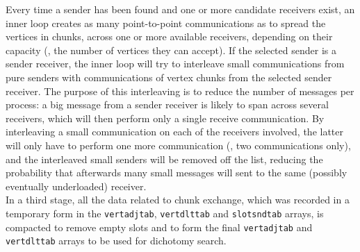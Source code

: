 Every time a sender has been found and one or more candidate receivers
exist, an inner loop creates as many point-to-point communications as
to spread the vertices in chunks, across one or more available
receivers, depending on their capacity (\ie, the number of vertices
they can accept). If the selected sender is a sender receiver, the
inner loop will try to interleave small communications from pure
senders with communications of vertex chunks from the selected
sender receiver. The purpose of this interleaving is to reduce the
number of messages per process: a big message from a sender receiver
is likely to span across several receivers, which will then perform
only a single receive communication. By interleaving a small
communication on each of the receivers involved, the latter will only
have to perform one more communication (\ie, two communications only),
and the interleaved small senders will be removed off the list,
reducing the probability that afterwards many small messages will sent
to the same (possibly eventually underloaded) receiver.
\\

In a third stage, all the data related to chunk exchange, which was
recorded in a temporary form in the \texttt{vertadjtab},
\texttt{vertdlttab} and \texttt{slotsndtab} arrays, is compacted to
remove empty slots and to form the final \texttt{vertadjtab} and
\texttt{vertdlttab} arrays to be used for dichotomy search.
\\

